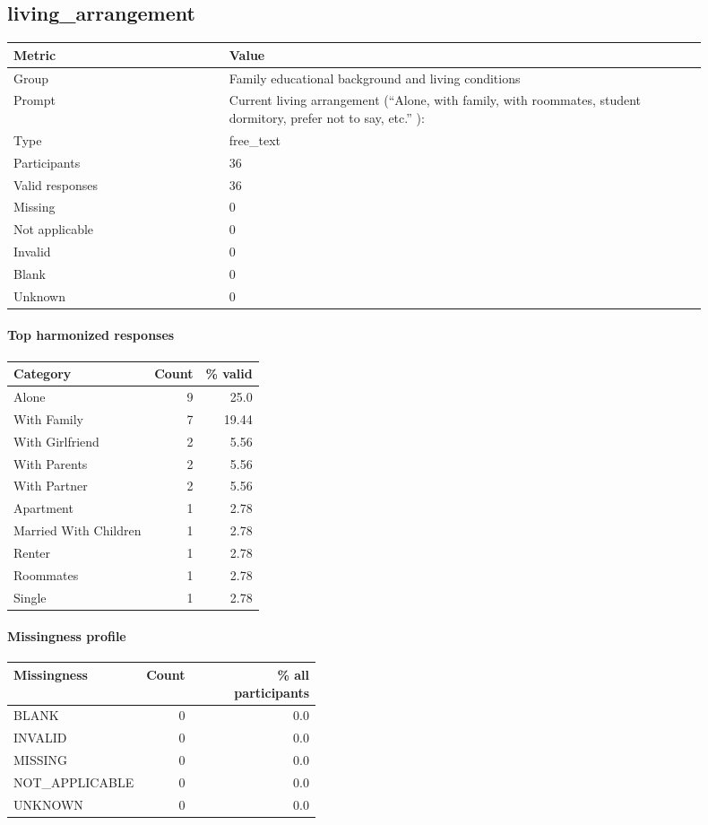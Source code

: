 \subsection*{living\_arrangement}
\begin{tabular}{p{0.28\linewidth}p{0.62\linewidth}}
\toprule
Metric & Value\\
\midrule
Group & Family educational background and living conditions\\
Prompt & Current living arrangement (“Alone, with family, with roommates, student dormitory, prefer not to say, etc.” ):\\
Type & free\_text\\
Participants & 36\\
Valid responses & 36\\
Missing & 0\\
Not applicable & 0\\
Invalid & 0\\
Blank & 0\\
Unknown & 0\\
\bottomrule
\end{tabular}

\paragraph{Top harmonized responses}
\begin{tabular}{p{0.56\linewidth}rr}
\toprule
Category & Count & \% valid\\
\midrule
Alone & 9 & 25.0\\
With Family & 7 & 19.44\\
With Girlfriend & 2 & 5.56\\
With Parents & 2 & 5.56\\
With Partner & 2 & 5.56\\
Apartment & 1 & 2.78\\
Married With Children & 1 & 2.78\\
Renter & 1 & 2.78\\
Roommates & 1 & 2.78\\
Single & 1 & 2.78\\
\bottomrule
\end{tabular}

\paragraph{Missingness profile}
\begin{tabular}{p{0.40\linewidth}rr}
\toprule
Missingness & Count & \% all participants\\
\midrule
BLANK & 0 & 0.0\\
INVALID & 0 & 0.0\\
MISSING & 0 & 0.0\\
NOT\_APPLICABLE & 0 & 0.0\\
UNKNOWN & 0 & 0.0\\
\bottomrule
\end{tabular}

